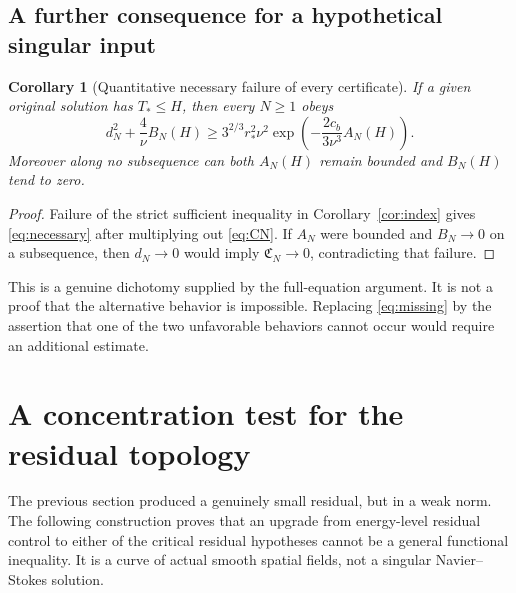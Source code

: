 \documentclass[11pt,a4paper]{article}
\newtheorem{corollary}[theorem]{Corollary}
\theoremstyle{definition}\newtheorem{definition}[theorem]{Definition}
\theoremstyle{remark}\newtheorem{remark}[theorem]{Remark}
\newcommand{\rstar}{r_*}
\newcommand{\cb}{c_b}
\numberwithin{equation}{section}
\begin{document}
\subsection{A further consequence for a hypothetical singular input}
\begin{corollary}[Quantitative necessary failure of every certificate]\label{cor:necessary}
If a given original solution has $T_*\le H$, then every $N\ge1$ obeys
\begin{equation}\label{eq:necessary}
 d_N^2+\frac4\nu B_N(H)
 \ge 3^{2/3}\rstar^2\nu^2
    \exp\!\left(-\frac{2\cb}{3\nu^3}A_N(H)\right).
\end{equation}
Moreover along no subsequence can both $A_N(H)$ remain bounded and $B_N(H)$ tend to zero.
\end{corollary}
\begin{proof}
Failure of the strict sufficient inequality in Corollary~\ref{cor:index} gives \eqref{eq:necessary} after multiplying out \eqref{eq:CN}. If $A_N$ were bounded and $B_N\to0$ on a subsequence, then $d_N\to0$ would imply $\mathfrak C_N\to0$, contradicting that failure.
\end{proof}
This is a genuine dichotomy supplied by the full-equation argument. It is not a proof that the alternative behavior is impossible. Replacing \eqref{eq:missing} by the assertion that one of the two unfavorable behaviors cannot occur would require an additional estimate.

\section{A concentration test for the residual topology}
\label{sec:concentration}
The previous section produced a genuinely small residual, but in a weak norm. The following construction proves that an upgrade from energy-level residual control to either of the critical residual hypotheses cannot be a general functional inequality. It is a curve of actual smooth spatial fields, not a singular Navier--Stokes solution.
\end{document}
